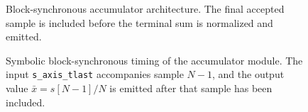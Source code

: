 \begin{figure}[H]
\begin{center}
\resizebox{\textwidth}{!}{}
\caption{Block-synchronous accumulator architecture. The final accepted sample is included before the terminal sum is normalized and emitted.}
\label{fig:accumulator}
\end{center}
\end{figure}

\begin{figure}[H]
\begin{center}
\resizebox{0.96\textwidth}{!}{}
\caption[Accumulator end-of-record timing.]{Symbolic block-synchronous timing of the accumulator module.  The input \texttt{s\_axis\_tlast} accompanies sample $N-1$, and the output value $\bar{x}=s[N-1]/N$ is emitted after that sample has been included.}
\label{fig:4_accumulator}
\end{center}
\end{figure}

